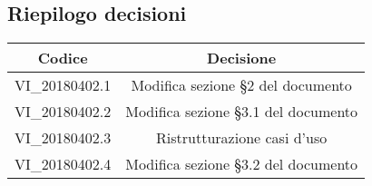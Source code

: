 \subsection{Riepilogo decisioni}

\begin{center}
    \begin{tabular}{c | c}
        \centering
        \rowcolor[gray]{.9} { \textbf{Codice} } & { \textbf{Decisione} } \\ 
        \hline
        \rowcolor[gray]{.8} VI\_20180402.1 & Modifica sezione §2 del documento \vAnalisiDeiRequisiti{} \\
        \rowcolor[gray]{.9} VI\_20180402.2 & Modifica sezione §3.1 del documento \vAnalisiDeiRequisiti{} \\
        \rowcolor[gray]{.8} VI\_20180402.3 & Ristrutturazione casi d'uso \\
        \rowcolor[gray]{.9} VI\_20180402.4 & Modifica sezione §3.2 del documento \vAnalisiDeiRequisiti{} \\
    \end{tabular}
\end{center}
